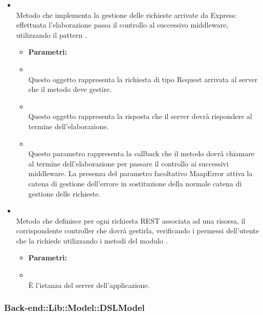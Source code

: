 \begin{itemize}
\item[] \textbf{} \\ Metodo che implementa la gestione delle richieste arrivate da Express: effettuata l'elaborazione passa il controllo al successivo middleware, utilizzando il pattern .
\begin{itemize}\addtolength{\itemsep}{-0.5\baselineskip}
\item[] \textbf{Parametri:}
\item[]  \\ Questo oggetto rappresenta la richiesta di tipo Request arrivata al server che il metodo deve gestire.
\item[]  \\ Questo oggetto rappresenta la risposta che il server dovrà rispondere al termine dell'elaborazione.
\item[]  \\ Questo parametro rappresenta la callback che il metodo dovrà chiamare al termine dell'elaborazione per passare il controllo ai successivi middleware.
La presenza del parametro facoltativo MaapError attiva la catena di gestione dell'errore in sostituzione della normale catena di gestione delle richieste.
\end{itemize}
\item[] \textbf{} \\ Metodo che definisce per ogni richiesta REST associata ad una risorsa, il corrispondente controller che dovrà gestirla, verificando i permessi dell'utente che la richiede utilizzando i metodi del modulo .

\begin{itemize}\addtolength{\itemsep}{-0.5\baselineskip}
\item[] \textbf{Parametri:}
\item[]  \\ È l'istanza del server dell'applicazione.
\end{itemize}
\end{itemize}

	\subsubsection{Back-end::Lib::Model::DSLModel} 
